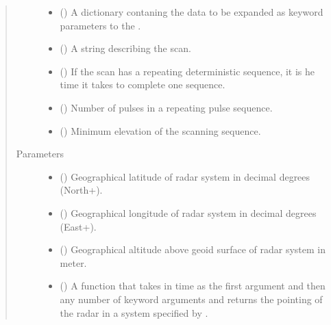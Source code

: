 \documentclass[letterpaper,10pt,english]{sphinxmanual}
\begin{document}
\begin{fulllineitems}
\begin{quote}
\begin{description}
\begin{itemize}
\item {} 
 () \textendash{} A dictionary contaning the data to be expanded as keyword parameters to the .

\item {} 
 () \textendash{} A string describing the scan.

\item {} 
 () \textendash{} If the scan has a repeating deterministic sequence, it is he time it takes to complete one sequence.

\item {} 
 () \textendash{} Number of pulses in a repeating pulse sequence.

\item {} 
 () \textendash{} Minimum elevation of the scanning sequence.

\end{itemize}

\item[{Parameters}] \leavevmode\begin{itemize}
\item {} 
 () \textendash{} Geographical latitude of radar system in decimal degrees  (North+).

\item {} 
 () \textendash{} Geographical longitude of radar system in decimal degrees (East+).

\item {} 
 () \textendash{} Geographical altitude above geoid surface of radar system in meter.

\item {} 
 () \textendash{} A function that takes in time as the first argument and then any number of keyword arguments and returns the pointing of the radar in a system specified by .


\end{itemize}
\end{description}
\end{quote}
\end{fulllineitems}
\end{document}
